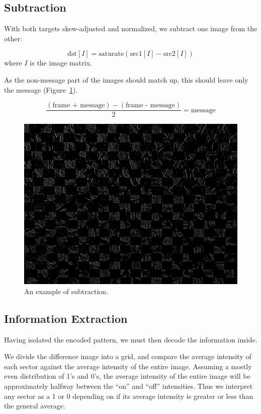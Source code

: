 \documentclass[11pt, letterpaper]{article}
\begin{document}
\subsection{Subtraction}
With both targets skew-adjusted and normalized, we subtract one image from the other:

$$\text{dst}[I] = \text{saturate}(\text{src1}[I] - \text{src2}[I])$$ where $I$ is the image matrix\cite{opencv_subtraction}.

As the non-message part of the images should match up, this should leave only the message (Figure~\ref{fig:subtract}).

$$\frac{(\text{frame + message}) - (\text{frame - message})}{2} = \text{message}$$

\begin{figure}[hbtp]
\centering
\includegraphics[scale=0.2]{img/subtract.png}
\caption{An example of subtraction.}
\label{fig:subtract}
\end{figure}

\subsection{Information Extraction}
Having isolated the encoded pattern, we must then decode the information inside.

We divide the difference image into a grid, and compare the average intensity of each sector against the average intensity of the entire image.
Assuming a mostly even distribution of 1's and 0's, the average intensity of the entire image will be approximately halfway between the ``on'' and ``off'' intensities. Thus we interpret any sector as a 1 or 0 depending on if its average intensity is greater or less than the general average.
\end{document}
